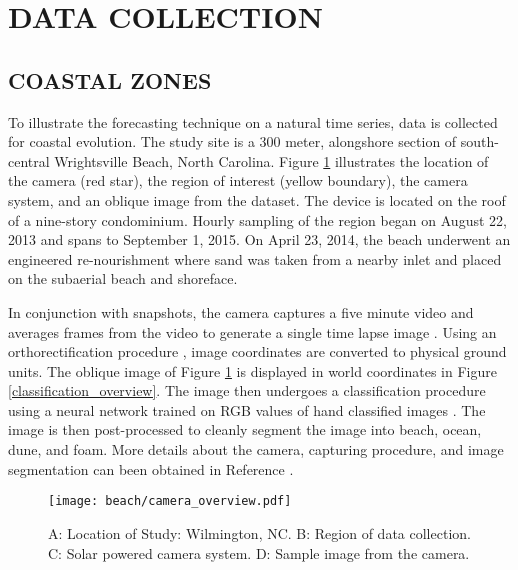 \newpage
\section{DATA COLLECTION}

\subsection{COASTAL ZONES}

To illustrate the forecasting technique on a natural time series, data is collected for coastal evolution. The study site is a 300 meter, alongshore section of south-central Wrightsville Beach, North Carolina. Figure \ref{camera_overview} illustrates the location of the camera (red star), the region of interest (yellow boundary), the camera system, and an oblique image from the dataset. The device is located on the roof of a nine-story condominium. Hourly sampling of the region began on August 22, 2013 and spans to September 1, 2015. On April 23, 2014, the beach underwent an engineered re-nourishment where sand was taken from a nearby inlet and placed on the subaerial beach and shoreface. 

In conjunction with snapshots, the camera captures a five minute video and averages frames from the video to generate a single time lapse image \cite{video_beach_monitoring}. Using an orthorectification procedure \cite{orthorectification}, image coordinates are converted to physical ground units. The oblique image of Figure \ref{camera_overview} is displayed in world coordinates in Figure \ref{classification_overview}. The image then undergoes a classification procedure using a neural network trained on RGB values of hand classified images \cite{neural_network}. The image is then post-processed to cleanly segment the image into beach, ocean, dune, and foam. More details about the camera, capturing procedure, and image segmentation can been obtained in Reference \cite{chaos_paper}.

\begin{figure}[htbp] %
   \centering
   \texttt{[image: beach/camera\_overview.pdf]} 
   \caption{A: Location of Study: Wilmington, NC. B: Region of data collection. C: Solar powered camera system. D: Sample image from the camera.}
   \label{camera_overview}
\end{figure}

